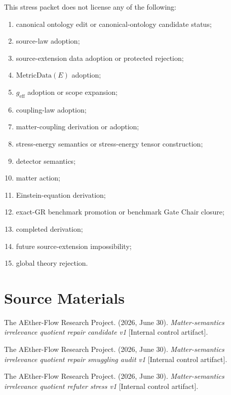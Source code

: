 This stress packet does not license any of the following:
\begin{enumerate}
  \item canonical ontology edit or canonical-ontology candidate status;
  \item source-law adoption;
  \item source-extension data adoption or protected rejection;
  \item \(\mathrm{MetricData}(E)\) adoption;
  \item \(g_{\mathrm{eff}}\) adoption or scope expansion;
  \item coupling-law adoption;
  \item matter-coupling derivation or adoption;
  \item stress-energy semantics or stress-energy tensor construction;
  \item detector semantics;
  \item matter action;
  \item Einstein-equation derivation;
  \item exact-GR benchmark promotion or benchmark Gate Chair closure;
  \item completed derivation;
  \item future source-extension impossibility;
  \item global theory rejection.
\end{enumerate}

\section{Source Materials}

The AEther-Flow Research Project. (2026, June 30). \emph{Matter-semantics
irrelevance quotient repair candidate v1} [Internal control artifact].

The AEther-Flow Research Project. (2026, June 30). \emph{Matter-semantics
irrelevance quotient repair smuggling audit v1} [Internal control artifact].

The AEther-Flow Research Project. (2026, June 30). \emph{Matter-semantics
irrelevance quotient refuter stress v1} [Internal control artifact].

